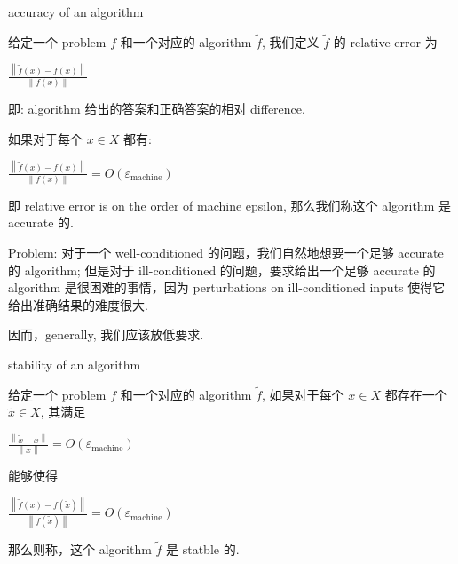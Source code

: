 \begin{definition}{accuracy of an algorithm}

给定一个 problem \(f\) 和一个对应的 algorithm \(\widetilde{f}\), 我们定义 \(\widetilde{f}\) 的 relative error 为

\(\frac{\left\| {\widetilde{f}(x) - f(x)} \right\|}{\left\| {f(x)} \right\|}\)

即: algorithm 给出的答案和正确答案的相对 difference.

如果对于每个 \(x \in X\) 都有:

\(\frac{\left\| {\widetilde{f}(x) - f(x)} \right\|}{\left\| {f(x)} \right\|} = O\left( \varepsilon_{\text{machine}} \right)\)

即 relative error is on the order of machine epsilon, 那么我们称这个 algorithm 是 accurate 的.

\end{definition}

Problem: 对于一个 well-conditioned 的问题，我们自然地想要一个足够 accurate 的 algorithm; 但是对于 ill-conditioned 的问题，要求给出一个足够 accurate 的 algorithm 是很困难的事情，因为 perturbations on ill-conditioned inputs 使得它给出准确结果的难度很大.

因而，generally, 我们应该放低要求.

\begin{definition}{stability of an algorithm}

给定一个 problem \(f\) 和一个对应的 algorithm \(\widetilde{f}\), 如果对于每个 \(x \in X\) 都存在一个 \(\widetilde{x} \in X\), 其满足

\(\frac{\left\| {\widetilde{x} - x} \right\|}{\left\| x \right\|} = O\left( \varepsilon_{\text{machine}} \right)\)

能够使得

\(\frac{\left\| {\widetilde{f}(x) - f\left( \widetilde{x} \right)} \right\|}{\left\| {f\left( \widetilde{x} \right)} \right\|} = O\left( \varepsilon_{\text{machine}} \right)\)

那么则称，这个 algorithm \(\widetilde{f}\) 是 statble 的.

\end{definition}

